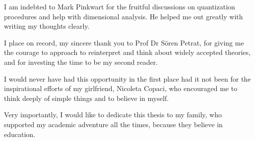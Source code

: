 \documentclass[twoside,a4paper,11pt]{article}
\numberwithin{equation}{section}
\begin{document}
I am indebted to Mark Pinkwart for the fruitful discussions on quantization procedures and help with dimensional analysis. He helped me out greatly with writing my thoughts clearly.

I place on record, my sincere thank you to Prof Dr S{\"o}ren Petrat, for giving me the courage to approach to reinterpret and think about widely accepted theories, and for investing the time to be my second reader.

I would never have had this opportunity in the first place had it not been for the inspirational efforts of my girlfriend, Nicoleta Copaci, who encouraged me to think deeply of simple things and to believe in myself.

Very importantly, I would like to dedicate this thesis to my family, who supported my academic adventure all the times, because they believe in education.

\newpage
\end{document}
